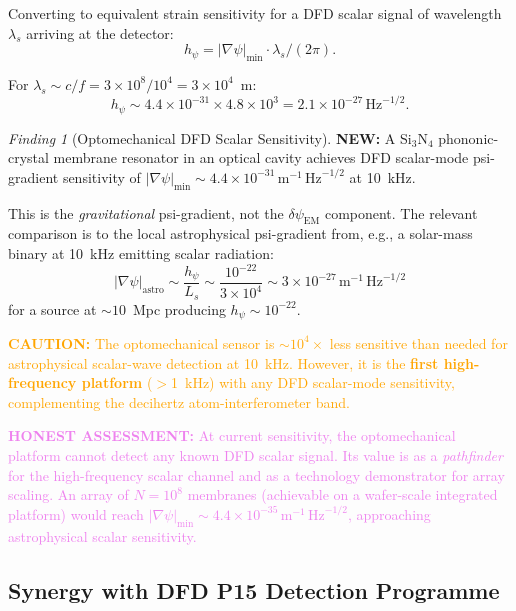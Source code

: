 \documentclass[11pt]{article}
\theoremstyle{definition}
\theoremstyle{remark}
\newtheorem{finding}[theorem]{Finding}
\newcommand{\ee}[1]{\times10^{#1}}
\newcommand{\sqrtHz}{\,\mathrm{Hz}^{-1/2}}
\newcommand{\dpsiem}{\delta\psi_{\mathrm{EM}}}
\newcommand{\caution}[1]{\textcolor{orange}{\textbf{CAUTION:} #1}}
\newcommand{\honest}[1]{\textcolor{violet}{\textbf{HONEST ASSESSMENT:} #1}}
\newcommand{\newresult}[1]{\textcolor{green!50!black}{\textbf{NEW:} #1}}
\begin{document}
Converting to equivalent strain sensitivity for a DFD scalar signal
of wavelength $\lambda_s$ arriving at the detector:
\begin{equation}
h_\psi = |\nabla\psi|_{\min} \cdot \lambda_s / (2\pi).
\end{equation}

For $\lambda_s \sim c/f = 3\ee{8}/10^4 = 3\ee{4}$~m:
\begin{equation}
h_\psi \sim 4.4\ee{-31} \times 4.8\ee{3} = 2.1\ee{-27}\sqrtHz.
\end{equation}

\begin{finding}[Optomechanical DFD Scalar Sensitivity]
\label{find:optomech-scalar}
\newresult{A Si$_3$N$_4$ phononic-crystal membrane resonator in an optical
cavity achieves DFD scalar-mode psi-gradient sensitivity of
$|\nabla\psi|_{\min} \sim 4.4\ee{-31}\,\mathrm{m}^{-1}\sqrtHz$ at 10~kHz.}

This is the \emph{gravitational} psi-gradient, not the $\dpsiem$ component.
The relevant comparison is to the local astrophysical psi-gradient from,
e.g., a solar-mass binary at 10~kHz emitting scalar radiation:
\begin{equation}
|\nabla\psi|_{\mathrm{astro}} \sim \frac{h_\psi}{L_s}
\sim \frac{10^{-22}}{3\ee{4}} \sim 3\ee{-27}\,\mathrm{m}^{-1}\sqrtHz
\end{equation}
for a source at $\sim 10$~Mpc producing $h_\psi \sim 10^{-22}$.

\caution{The optomechanical sensor is $\sim 10^4\times$ less sensitive
than needed for astrophysical scalar-wave detection at 10~kHz. However,
it is the \textbf{first high-frequency platform} ($>$1~kHz) with any
DFD scalar-mode sensitivity, complementing the decihertz
atom-interferometer band.}

\honest{At current sensitivity, the optomechanical platform cannot detect
any known DFD scalar signal. Its value is as a \emph{pathfinder} for
the high-frequency scalar channel and as a technology demonstrator for
array scaling. An array of $N = 10^8$ membranes (achievable on a
wafer-scale integrated platform) would reach
$|\nabla\psi|_{\min} \sim 4.4\ee{-35}\,\mathrm{m}^{-1}\sqrtHz$,
approaching astrophysical scalar sensitivity.}
\end{finding}

\subsection{Synergy with DFD P15 Detection Programme}
\end{document}
